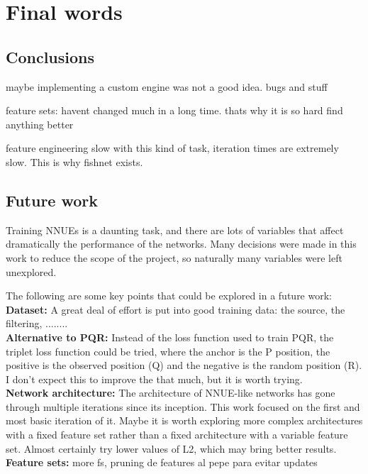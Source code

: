 \section{Final words}
\subsection{Conclusions}

maybe implementing a custom engine was not a good idea. bugs and stuff

feature sets: havent changed much in a long time. thats why it is so hard find anything better

feature engineering slow with this kind of task, iteration times are extremely slow. This is why fishnet exists.




\subsection{Future work}

Training NNUEs is a daunting task, and there are lots of variables that affect dramatically the performance of the networks. Many decisions were made in this work to reduce the scope of the project, so naturally many variables were left unexplored.

The following are some key points that could be explored in a future work: \\

\textbf{Dataset:}
A great deal of effort is put into good training data: the source, the filtering, ........ 
\\

\textbf{Alternative to PQR:} Instead of the loss function used to train PQR, the triplet loss function could be tried, where the anchor is the P position, the positive is the observed position (Q) and the negative is the random position (R). I don't expect this to improve the that much, but it is worth trying. \\

\textbf{Network architecture:} The architecture of NNUE-like networks has gone through multiple iterations since its inception. This work focused on the first and most basic iteration of it. Maybe it is worth exploring more complex architectures with a fixed feature set rather than a fixed architecture with a variable feature set.
Almost certainly try lower values of L2, which may bring better results. \\

\textbf{Feature sets:} more fs, pruning de features al pepe para evitar updates
